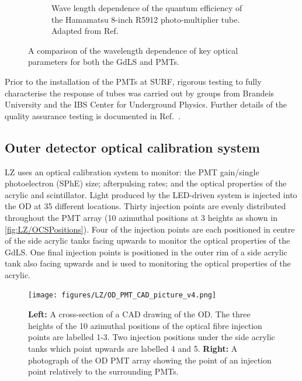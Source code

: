 \begin{figure}[!ht]
\begin{subfigure}{0.47\textwidth}
         \caption{Wave length dependence of the quantum efficiency of the Hamamatsu 8-inch R5912 photo-multiplier tube. Adapted from Ref.~\cite{HamamatsuR5912}}
         \label{fig:LZ/ODPMTQE}
     \end{subfigure}
     \caption{A comparison of the wavelength dependence of key optical parameters for both the GdLS and PMTs.}
     \label{fig:LZ/ODPMTSpecRes}
\end{figure}
Prior to the installation of the PMTs at SURF, rigorous testing to fully characterise the response of tubes was carried out by groups from Brandeis University and the IBS Center for Underground Physics. Further details of the quality assurance testing is documented in Ref.~\cite{lkorley:thesis}.

\subsection{Outer detector optical calibration system}\label{sec:LZ/ODOCS}
LZ uses an optical calibration system to monitor: the PMT gain/single photoelectron (SPhE) size; afterpulsing rates; and the optical properties of the acrylic and scintillator. Light produced by the LED-driven system is injected into the OD at 35 different locations. Thirty injection points are evenly distributed throughout the PMT array  (10 azimuthal positions at 3 heights as shown in \autoref{fig:LZ/OCSPositions}). Four of the injection points are each positioned in centre of the side acrylic tanks facing upwards to monitor the optical properties of the GdLS. One final injection points is positioned in the outer rim of a side acrylic tank also facing upwards and is used to monitoring the optical properties of the acrylic.
\begin{figure}[!ht]
    \centering
    \texttt{[image: figures/LZ/OD\_PMT\_CAD\_picture\_v4.png]}
    \caption{\textbf{Left:} A cross-section of a CAD drawing of the OD. The three  heights of the 10 azimuthal positions of the optical fibre injection points are labelled 1-3. Two injection positions under the side acrylic tanks which point upwards are labelled 4 and 5. \textbf{Right:} A photograph of the OD PMT array showing the point of an injection point relatively to the surrounding PMTs.}
    \label{fig:LZ/OCSPositions}
\end{figure}
